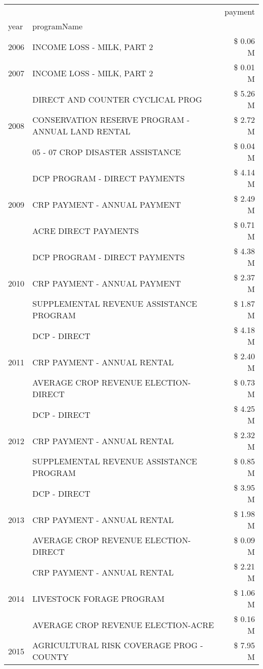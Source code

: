 \begin{tabular}{llr}
\toprule
 &  & payment \\
year & programName &  \\
\midrule
2006 & INCOME LOSS - MILK, PART 2 & \$ 0.06 M \\
\cline{1-3}
2007 & INCOME LOSS - MILK, PART 2 & \$ 0.01 M \\
\cline{1-3}
\multirow[t]{3}{*}{2008} & DIRECT AND COUNTER CYCLICAL PROG & \$ 5.26 M \\
 & CONSERVATION RESERVE PROGRAM - ANNUAL LAND RENTAL & \$ 2.72 M \\
 & 05 - 07 CROP DISASTER ASSISTANCE & \$ 0.04 M \\
\cline{1-3}
\multirow[t]{3}{*}{2009} & DCP PROGRAM - DIRECT PAYMENTS & \$ 4.14 M \\
 & CRP PAYMENT - ANNUAL PAYMENT & \$ 2.49 M \\
 & ACRE DIRECT PAYMENTS & \$ 0.71 M \\
\cline{1-3}
\multirow[t]{3}{*}{2010} & DCP PROGRAM - DIRECT PAYMENTS & \$ 4.38 M \\
 & CRP PAYMENT - ANNUAL PAYMENT & \$ 2.37 M \\
 & SUPPLEMENTAL REVENUE ASSISTANCE PROGRAM & \$ 1.87 M \\
\cline{1-3}
\multirow[t]{3}{*}{2011} & DCP - DIRECT & \$ 4.18 M \\
 & CRP PAYMENT - ANNUAL RENTAL & \$ 2.40 M \\
 & AVERAGE CROP REVENUE ELECTION-DIRECT & \$ 0.73 M \\
\cline{1-3}
\multirow[t]{3}{*}{2012} & DCP - DIRECT & \$ 4.25 M \\
 & CRP PAYMENT - ANNUAL RENTAL & \$ 2.32 M \\
 & SUPPLEMENTAL REVENUE ASSISTANCE PROGRAM & \$ 0.85 M \\
\cline{1-3}
\multirow[t]{3}{*}{2013} & DCP - DIRECT & \$ 3.95 M \\
 & CRP PAYMENT - ANNUAL RENTAL & \$ 1.98 M \\
 & AVERAGE CROP REVENUE ELECTION-DIRECT & \$ 0.09 M \\
\cline{1-3}
\multirow[t]{3}{*}{2014} & CRP PAYMENT - ANNUAL RENTAL & \$ 2.21 M \\
 & LIVESTOCK FORAGE PROGRAM & \$ 1.06 M \\
 & AVERAGE CROP REVENUE ELECTION-ACRE & \$ 0.16 M \\
\cline{1-3}
\multirow[t]{3}{*}{2015} & AGRICULTURAL RISK COVERAGE PROG - COUNTY & \$ 7.95 M \\

\end{tabular}
